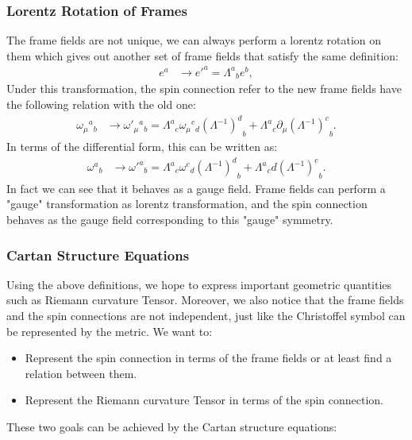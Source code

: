 \subsubsection{Lorentz Rotation of Frames}

The frame fields are not unique, we can always perform a lorentz rotation on them which gives out another set of frame fields that satisfy the same definition:
\begin{align}
  e^a &\to {e'}^a = {\Lambda^a}_b e^b, 
\end{align}
Under this transformation, the spin connection refer to the new frame fields have the following relation with the old one:
\begin{align}
  \omega_\mu{}^a{}_b &\to {\omega'}_\mu{}^a{}_b = {\Lambda^a}_c \omega_\mu{}^c{}_d {(\Lambda^{-1})^d}_b + {\Lambda^a}_c \partial_\mu {(\Lambda^{-1})^c}_b.
\end{align}
In terms of the differential form, this can be written as:
\begin{align}
  \omega^a{}_b &\to {\omega'}^a{}_b = {\Lambda^a}_c \omega^c{}_d {(\Lambda^{-1})^d}_b + {\Lambda^a}_c d{(\Lambda^{-1})^c}_b.
\end{align}
In fact we can see that it behaves as a gauge field. Frame fields can perform a "gauge" transformation as lorentz transformation, and the spin connection behaves as the gauge field corresponding to this "gauge" symmetry.


\subsubsection{Cartan Structure Equations}

Using the above definitions, we hope to express important geometric quantities such as Riemann curvature Tensor. Moreover, we also notice that the frame fields and the spin connections are not independent, just like the Christoffel symbol can be represented by the metric. We want to:
\begin{itemize}
  \item Represent the spin connection in terms of the frame fields or at least find a relation between them. 
    \item Represent the Riemann curvature Tensor in terms of the spin connection.
\end{itemize}
These two goals can be achieved by the Cartan structure equations: 

